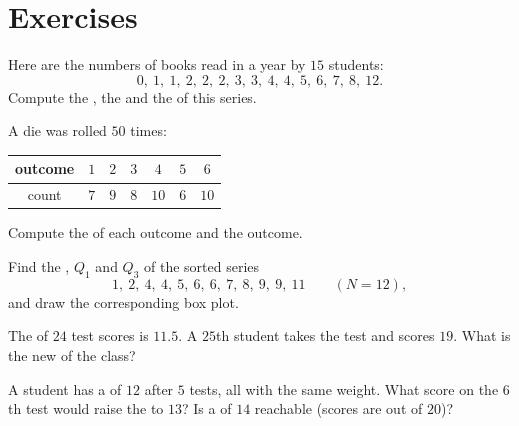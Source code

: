 \section{Exercises}

\begin{exercise}[$\star$]\label{exo:g10:stats:1}
Here are the numbers of books read in a year by $15$ students:
\[
0,\ 1,\ 1,\ 2,\ 2,\ 2,\ 3,\ 3,\ 4,\ 4,\ 5,\ 6,\ 7,\ 8,\ 12 .
\]
Compute the , the  and the  of this series.
\end{exercise}

\begin{exercise}[$\star$]\label{exo:g10:stats:2}
A die was rolled $50$ times:
\begin{center}
\renewcommand{\arraystretch}{1.2}
\begin{tabular}{c|cccccc}
outcome & $1$ & $2$ & $3$ & $4$ & $5$ & $6$ \\
\hline
count & $7$ & $9$ & $8$ & $10$ & $6$ & $10$ \\
\end{tabular}
\end{center}
Compute the  of each outcome and the  outcome.
\end{exercise}

\begin{exercise}[$\star$]\label{exo:g10:stats:3}
Find the , $Q_1$ and $Q_3$ of the sorted series
\[
1,\ 2,\ 4,\ 4,\ 5,\ 6,\ 6,\ 7,\ 8,\ 9,\ 9,\ 11 \qquad (N = 12),
\]
and draw the corresponding box plot.
\end{exercise}

\begin{exercise}[$\star$]\label{exo:g10:stats:4}
The  of $24$ test scores is $11.5$. A $25$th student takes the test
and scores $19$. What is the new  of the class?
\end{exercise}

\begin{exercise}[$\star\star$]\label{exo:g10:stats:5}
A student has a  of $12$ after $5$ tests, all with the same weight.
What score on the $6$th test would raise the  to $13$? Is a  of
$14$ reachable (scores are out of $20$)?
\end{exercise}

